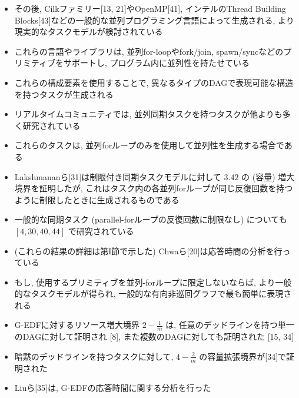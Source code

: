 \begin{frame}{}
    \begin{itemize}
        \item その後, Cilkファミリー[13, 21]やOpenMP[41], インテルのThread Building Blocks[43]などの一般的な並列プログラミング言語によって生成される, より現実的なタスクモデルが検討されている
\item これらの言語やライブラリは, 並列for-loopやfork/join, spawn/syncなどのプリミティブをサポートし, プログラム内に並列性を持たせている
\item これらの構成要素を使用することで, 異なるタイプのDAGで表現可能な構造を持つタスクが生成される
    \end{itemize}
\end{frame}

\begin{frame}{}
    \begin{itemize}
        \item リアルタイムコミュニティでは, 並列同期タスクを持つタスクが他よりも多く研究されている
\item これらのタスクは, 並列forループのみを使用して並列性を生成する場合である
\item Lakshmananら[31]は制限付き同期タスクモデルに対して $3.42$ の (容量) 増大境界を証明したが, これはタスク内の各並列forループが同じ反復回数を持つように制限したときに生成されるものである
\item 一般的な同期タスク (parallel-forループの反復回数に制限なし) についても $[4,30,40,44]$ で研究されている
\item (これらの結果の詳細は第I節で示した) Chwaら[20]は応答時間の分析を行っている
    \end{itemize}
\end{frame}

\begin{frame}{}
    \begin{itemize}
        \item もし, 使用するプリミティブを並列-forループに限定しないならば, より一般的なタスクモデルが得られ, 一般的な有向非巡回グラフで最も簡単に表現される
\item G-EDFに対するリソース増大境界 $2-\frac{1}{m}$ は, 任意のデッドラインを持つ単一のDAGに対して証明され [8], また複数のDAGに対しても証明された [15, 34]
\item 暗黙のデッドラインを持つタスクに対して, $4-\frac{2}{m}$ の容量拡張境界が[34]で証明された
\item Liuら[35]は, G-EDFの応答時間に関する分析を行った
    \end{itemize}
\end{frame}

